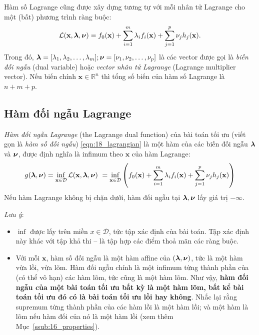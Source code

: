 Hàm số Lagrange cũng được xây dựng tương tự với mỗi nhân tử Lagrange cho một (bất) phương trình ràng buộc:
\begin{equation*}
\mathcal{L}(\mathbf{x}, \boldsymbol{\lambda}, \boldsymbol{\nu}) = f_0(\mathbf{x}) + \sum_{i=1}^m \lambda_if_i(\mathbf{x}) + \sum_{j=1}^p \nu_j h_j(\mathbf{x}).
\end{equation*}
Trong đó, $\boldsymbol{\lambda} = [\lambda_1, \lambda_2, \dots, \lambda_m]; \boldsymbol{\nu} = [\nu_1, \nu_2,
\dots, \nu_p]$ là các vector được gọi là \textit{biến đối ngẫu}
({dual variable}) hoặc \textit{vector nhân tử Lagrange}
({Lagrange multiplier vector}). Nếu biến chính $\mathbf{x} \in
\mathbb{R}^n$ thì tổng số biến của hàm số Lagrange là $n + m + p$.


\subsection{Hàm đối ngẫu Lagrange }
\textit{Hàm đối ngẫu Lagrange} ({the Lagrange dual function}) của bài toán
tối ưu (viết gọn là \textit{hàm số đối ngẫu}) \eqref{eqn:18_lagrangian} là một
hàm của các biến đối ngẫu $\boldsymbol{\lambda}$ và $\boldsymbol{\nu}$, được định nghĩa là infimum theo $\mathbf{x}$
của hàm Lagrange:
\begin{equation}
g(\boldsymbol{\lambda}, \boldsymbol{\nu}) = \inf_{\mathbf{x} \in \mathcal{D}} \mathcal{L}(\mathbf{x},
\boldsymbol{\lambda}, \boldsymbol{\nu})\\\
= \inf_{\mathbf{x} \in \mathcal{D}}\left( f_0(\mathbf{x}) + \sum_{i=1}^m \lambda_if_i(\mathbf{x}) + \sum_{j=1}^p \nu_j h_j(\mathbf{x})\right)
\end{equation}
Nếu hàm Lagrange không bị chặn dưới, hàm đối ngẫu tại $\boldsymbol{\lambda}, \boldsymbol{\nu}$ lấy giá trị $-\infty$.

\textit{Lưu ý}:
\begin{itemize}
\item $\inf$ được lấy trên miền $x \in \mathcal{D}$, tức tập xác định của
bài toán. Tập xác
định này khác với tập khả thi  --  là tập hợp các điểm thoả mãn các
ràng buộc.

\item Với mỗi $\mathbf{x}$, hàm số đối ngẫu là một hàm {affine}
của $(\boldsymbol{\lambda}, \boldsymbol{\nu})$, tức là một hàm vừa lồi, vừa lõm. {Hàm
đối ngẫu} chính là một {infimum} từng thành phần của (có thể vô hạn) các hàm
lõm, tức cũng là một hàm lõm. Như vậy, \textbf{hàm đối ngẫu của một bài toán
tối ưu bất kỳ là một hàm lõm, bất kể bài toán tối ưu đó có là bài toán tối ưu lồi hay không}. Nhắc lại rằng {supremum} từng thành phần của các hàm
lồi là một hàm lồi; và một hàm là lõm nếu hàm đối của nó là một hàm lồi (xem thêm
Mục~\ref{ssub:16_properties}).
\end{itemize}



